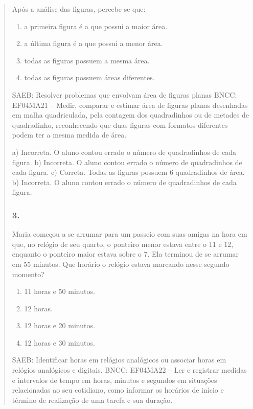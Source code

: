 \begin{enumerate}
\begin{escolha}
\begin{enumerate}
\begin{itemize}
\begin{itemize}
\begin{escolha}
\begin{quote}
Após a análise das figuras, percebe-se que:

\begin{enumerate}
\def\labelenumi{\alph{enumi})}
\item
  a primeira figura é a que possui a maior área.
\item
  a última figura é a que possui a menor área.
\item
  todas as figuras possuem a mesma área.
\item
  todas as figuras possuem áreas diferentes.
\end{enumerate}

SAEB: Resolver problemas que envolvam área de figuras planas
BNCC: EF04MA21 -- Medir, comparar e estimar área de figuras planas desenhadas em malha quadriculada,
pela contagem dos quadradinhos ou de metades de quadradinho, reconhecendo que duas figuras
com formatos diferentes podem ter a mesma medida de área.

a) Incorreta. O aluno contou errado o número de quadradinhos de cada figura.
b) Incorreta. O aluno contou errado o número de quadradinhos de cada figura.
c) Correta. Todas as figuras possuem 6 quadradinhos de área.
b) Incorreta. O aluno contou errado o número de quadradinhos de cada figura.

\subsubsection{3.}\label{section-64}

Maria começou a se arrumar para um passeio com suas amigas na hora em
que, no relógio de seu quarto, o ponteiro menor estava entre o 11 e 12, enquanto o ponteiro maior estava sobre o 7. Ela terminou de se arrumar em 55 minutos. Que horário
o relógio estava marcando nesse segundo momento?

\begin{enumerate}
\def\labelenumi{\alph{enumi})}
\item
  11 horas e 50 minutos.
\item
  12 horas.
\item
  12 horas e 20 minutos.
\item
  12 horas e 30 minutos.
\end{enumerate}

SAEB: Identificar horas em relógios analógicos ou associar horas em relógios analógicos e digitais.
BNCC: EF04MA22 -- Ler e registrar medidas e intervalos de tempo em horas, minutos e segundos em
situações relacionadas ao seu cotidiano, como informar os horários de início e término de realização
de uma tarefa e sua duração.


\end{quote}
\end{escolha}
\end{itemize}
\end{itemize}
\end{enumerate}
\end{escolha}
\end{enumerate}
